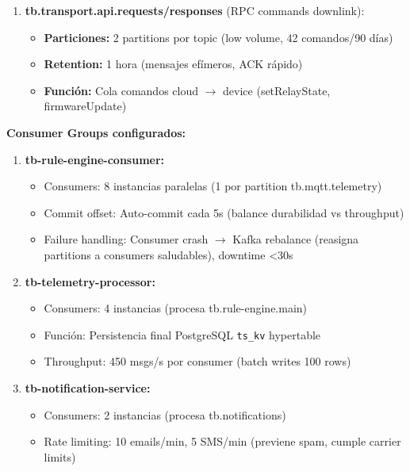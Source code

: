 \begin{enumerate}
    \item \textbf{tb.transport.api.requests/responses} (RPC commands downlink):
    \begin{itemize}
        \item \textbf{Particiones:} 2 partitions por topic (low volume, 42 comandos/90 días)
        \item \textbf{Retention:} 1 hora (mensajes efímeros, ACK rápido)
        \item \textbf{Función:} Cola comandos cloud $\rightarrow$ device (setRelayState, firmwareUpdate)
    \end{itemize}
\end{enumerate}

\textbf{Consumer Groups configurados:}

\begin{enumerate}
    \item \textbf{tb-rule-engine-consumer:}
    \begin{itemize}
        \item Consumers: 8 instancias paralelas (1 por partition tb.mqtt.telemetry)
        \item Commit offset: Auto-commit cada 5s (balance durabilidad vs throughput)
        \item Failure handling: Consumer crash $\rightarrow$ Kafka rebalance (reasigna partitions a consumers saludables), downtime <30s
    \end{itemize}
    
    \item \textbf{tb-telemetry-processor:}
    \begin{itemize}
        \item Consumers: 4 instancias (procesa tb.rule-engine.main)
        \item Función: Persistencia final PostgreSQL \texttt{ts\_kv} hypertable
        \item Throughput: 450 msgs/s por consumer (batch writes 100 rows)
    \end{itemize}
    
    \item \textbf{tb-notification-service:}
    \begin{itemize}
        \item Consumers: 2 instancias (procesa tb.notifications)
        \item Rate limiting: 10 emails/min, 5 SMS/min (previene spam, cumple carrier limits)
    \end{itemize}
\end{enumerate}

